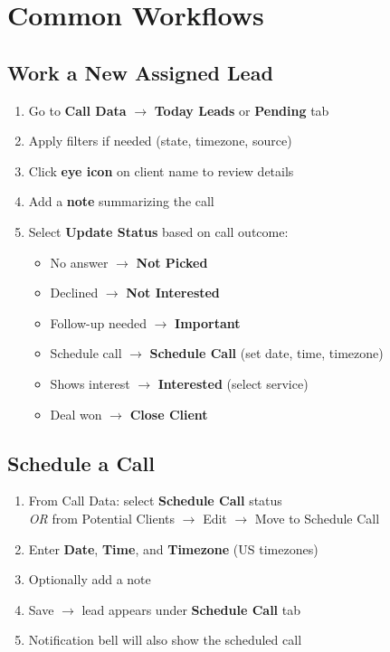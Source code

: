 \documentclass[11pt,a4paper]{article}
\begin{document}
\section{Common Workflows}

\subsection{Work a New Assigned Lead}

\begin{workflowbox}
\begin{enumerate}
    \item Go to \textbf{Call Data} $\rightarrow$ \textbf{Today Leads} or \textbf{Pending} tab
    \item Apply filters if needed (state, timezone, source)
    \item Click \textbf{eye icon} on client name to review details
    \item Add a \textbf{note} summarizing the call
    \item Select \textbf{Update Status} based on call outcome:
    \begin{itemize}
        \item No answer $\rightarrow$ \textbf{Not Picked}
        \item Declined $\rightarrow$ \textbf{Not Interested}
        \item Follow-up needed $\rightarrow$ \textbf{Important}
        \item Schedule call $\rightarrow$ \textbf{Schedule Call} (set date, time, timezone)
        \item Shows interest $\rightarrow$ \textbf{Interested} (select service)
        \item Deal won $\rightarrow$ \textbf{Close Client}
    \end{itemize}
\end{enumerate}
\end{workflowbox}

\subsection{Schedule a Call}

\begin{workflowbox}
\begin{enumerate}
    \item From Call Data: select \textbf{Schedule Call} status\\
          \textit{OR} from Potential Clients $\rightarrow$ Edit $\rightarrow$ Move to Schedule Call
    \item Enter \textbf{Date}, \textbf{Time}, and \textbf{Timezone} (US timezones)
    \item Optionally add a note
    \item Save $\rightarrow$ lead appears under \textbf{Schedule Call} tab
    \item Notification bell will also show the scheduled call
\end{enumerate}
\end{workflowbox}
\end{document}
